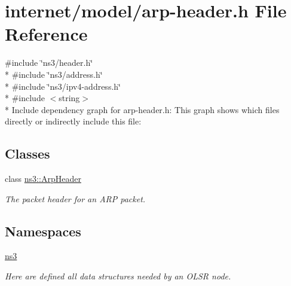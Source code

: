 \hypertarget{arp-header_8h}{}\section{internet/model/arp-\/header.h File Reference}
\label{arp-header_8h}
{\ttfamily \#include \char`\"{}ns3/header.\+h\char`\"{}}\\*
{\ttfamily \#include \char`\"{}ns3/address.\+h\char`\"{}}\\*
{\ttfamily \#include \char`\"{}ns3/ipv4-\/address.\+h\char`\"{}}\\*
{\ttfamily \#include $<$string$>$}\\*
Include dependency graph for arp-\/header.h\+:
This graph shows which files directly or indirectly include this file\+:
\subsection*{Classes}
\begin{DoxyCompactItemize}
\item 
class \hyperlink{classns3_1_1ArpHeader}{ns3\+::\+Arp\+Header}
\begin{DoxyCompactList}\small\item\em The packet header for an A\+RP packet. \end{DoxyCompactList}\end{DoxyCompactItemize}
\subsection*{Namespaces}
\begin{DoxyCompactItemize}
\item 
 \hyperlink{namespacens3}{ns3}
\begin{DoxyCompactList}\small\item\em Here are defined all data structures needed by an O\+L\+SR node. \end{DoxyCompactList}\end{DoxyCompactItemize}
